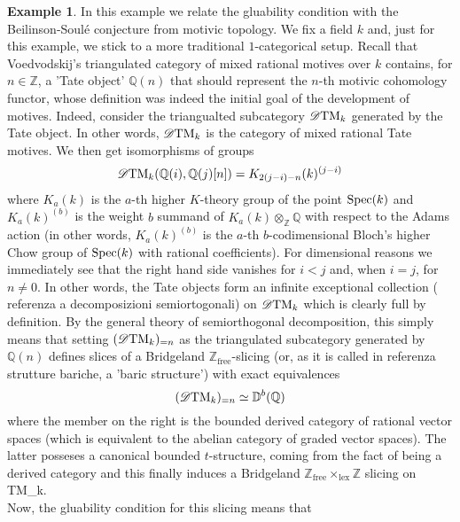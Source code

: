 \documentclass{article}
\theoremstyle{definition}
\newtheorem{exmp}[thm]{Example}
\newcommand{\Z}{\mathbb{Z}}
\begin{document}
\begin{exmp}
  In this example we relate the gluability condition with the Beilinson-Soul\'e conjecture from motivic topology. We fix a field $k$ and, just for this example, we stick to a more traditional $1$-categorical setup. Recall that Voedvodskij's triangulated category of mixed rational motives over $k$ contains, for $n \in \Z$, a 'Tate object' $\mathbb{Q}(n)$ that should represent the $n$-th motivic cohomology functor, whose definition was indeed the initial goal of the development of motives. Indeed, consider the triangualted subcategory $\mathscr{D}\textnormal{TM}_k$ generated by the Tate object. In other words, $\mathscr{D}\textnormal{TM}_k$ is the category of mixed rational Tate motives. We then get isomorphisms of groups
  \[
   \mathscr{D}\textnormal{TM}_k(\mathbb{Q}(i),\mathbb{Q}(j)[n])=K_{2(j-i)-n}(k)^{(j-i)}
   \]
   where $K_a(k)$ is the $a$-th higher $K$-theory group of the point $\textnormal{Spec}(k)$ and $K_a(k)^{(b)}$ is the weight $b$ summand of $K_a(k) \otimes_{\mathbb{Z}} \mathbb{Q}$ with respect to the Adams action (in other words, $K_a(k)^{(b)}$ is the $a$-th $b$-codimensional Bloch's higher Chow group of $\textnormal{Spec}(k)$ with rational coefficients). For dimensional reasons we immediately see that the right hand side vanishes for $i < j$ and, when $i = j$, for $n \neq 0$. In other words, the Tate objects form an infinite exceptional collection ({\color{red} referenza a decomposizioni semiortogonali}) on $\mathscr{D}\textnormal{TM}_k$ which is clearly full by definition. By the general theory of semiorthogonal decomposition, this simply means that setting $(\mathscr{D}\textnormal{TM}_k)_{=n}$ as the triangulated subcategory generated by $\mathbb{Q}(n)$ defines slices of a Bridgeland $\Z_{\mathrm{free}}$-slicing (or, as it is called in {\color{red} referenza strutture bariche}, a 'baric structure') with exact equivalences
   \[
   (\mathscr{D}\textnormal{TM}_k)_{=n} \simeq \mathbb{D}^b(\mathbb{Q})
   \]
   where the member on the right is the bounded derived category of rational vector spaces (which is equivalent to the abelian category of graded vector spaces). The latter posseses a canonical bounded $t$-structure, coming from the fact of being a derived category and this finally induces a Bridgeland $\Z_{\mathrm{free}} \times_{\mathrm{lex}} \Z$ slicing on \textnormal{TM}_k. \\
   Now, the gluability condition for this slicing means that 






\end{exmp}
\end{document}
